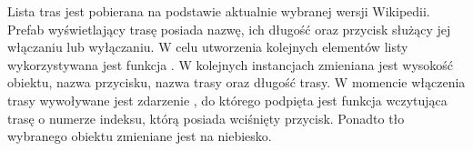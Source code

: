 Lista tras jest pobierana na podstawie aktualnie wybranej wersji Wikipedii. Prefab wyświetlający trasę posiada nazwę, ich długość oraz przycisk służący jej włączaniu lub wyłączaniu. W celu utworzenia kolejnych elementów listy wykorzystywana jest funkcja  . W kolejnych instancjach zmieniana jest wysokość obiektu, nazwa przycisku, nazwa trasy oraz długość trasy.  W momencie włączenia trasy wywoływane jest zdarzenie  , do którego podpięta jest funkcja   wczytująca trasę o numerze indeksu, którą posiada wciśnięty przycisk. Ponadto tło wybranego obiektu zmieniane jest na niebiesko.
